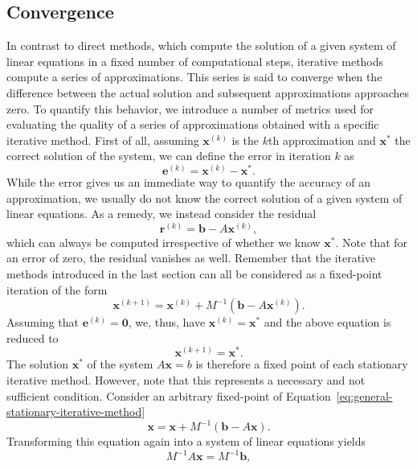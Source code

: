 \subsection{Convergence}
In contrast to direct methods, which compute the solution of a given system of linear equations in a fixed number of computational steps, iterative methods compute a series of approximations.
This series is said to converge when the difference between the actual solution and subsequent approximations approaches zero.
To quantify this behavior, we introduce a number of metrics used for evaluating the quality of a series of approximations obtained with a specific iterative method.
First of all, assuming $\bm{x}^{(k)}$ is the $k$th approximation and $\bm{x}^{*}$ the correct solution of the system, we can define the error in iteration $k$ as
\begin{equation*}
	\bm{e}^{(k)} = \bm{x}^{(k)} - \bm{x}^{*}.
\end{equation*}
While the error gives us an immediate way to quantify the accuracy of an approximation, we usually do not know the correct solution of a given system of linear equations.
As a remedy, we instead consider the residual
\begin{equation*}
	\bm{r}^{(k)} = \bm{b} - A \bm{x}^{(k)},
\end{equation*}
which can always be computed irrespective of whether we know $\bm{x}^{*}$.
Note that for an error of zero, the residual vanishes as well.
Remember that the iterative methods introduced in the last section can all be considered as a fixed-point iteration of the form
\begin{equation}
	\bm{x}^{(k+1)} = \bm{x}^{(k)} + M^{-1}(\bm b - A \bm{x}^{(k)}).
\end{equation}
Assuming that $\bm{e}^{(k)} = \bm{0}$, we, thus, have $\bm{x}^{(k)} = \bm{x}^{*}$ and the above equation is reduced to
\begin{equation}
	\bm{x}^{(k+1)} = \bm{x}^{*}.
\end{equation}
The solution $\bm{x}^{*}$ of the system $A \bm{x} = b$ is therefore a fixed point of each stationary iterative method.
However, note that this represents a necessary and not sufficient condition. 
Consider an arbitrary fixed-point of Equation~\eqref{eq:general-stationary-iterative-method}
\begin{equation*}
	\bm{x} = \bm{x} + M^{-1}(\bm b - A \bm{x}).
\end{equation*}
Transforming this equation again into a system of linear equations yields
\begin{equation*}
	M^{-1} A \bm{x} = M^{-1}\bm b,
\end{equation*}

